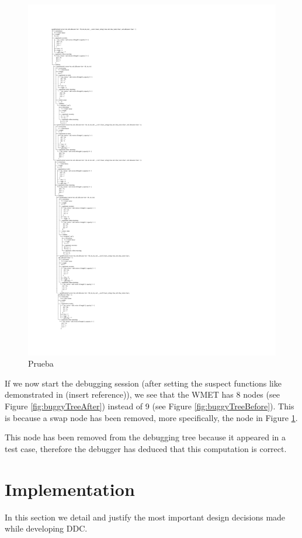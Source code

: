 \begin{figure}[p]
\centering
    \caption{Prueba}
    \label{fig:correctNodeRemoved}
\includegraphics[width=\textwidth,height=\textheight,keepaspectratio]{Imagenes/Vectorial/buggy.pdf}
\end{figure}
If we now start the debugging session (after setting the suspect functions like demonstrated in (insert reference)), we see that the WMET has 8 nodes (see Figure \ref{fig:buggyTreeAfter}) instead of 9 (see Figure \ref{fig:buggyTreeBefore}). This is because a swap node has been removed, more specifically, the node in Figure \ref{fig:correctNodeRemoved}.


This node has been removed from the debugging tree because it appeared in a test case, therefore the debugger has deduced that this computation is correct.




\section{Implementation}
In this section we detail and justify the most important design decisions made while developing DDC.
